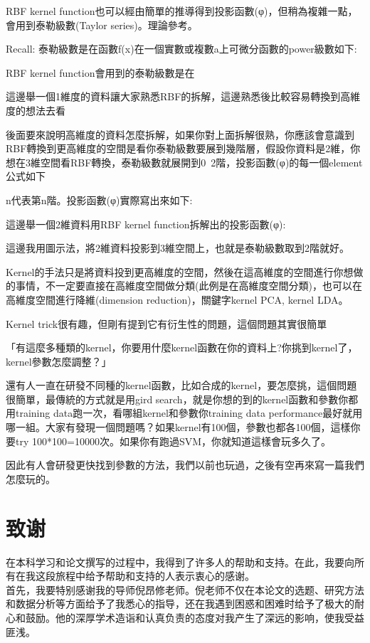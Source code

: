 \documentclass[12pt,a4paper]{amsart}
\begin{document}
RBF kernel function也可以經由簡單的推導得到投影函數(φ)，但稍為複雜一點，會用到泰勒級數(Taylor series)。理論參考。

Recall: 泰勒級數是在函數f(x)在一個實數或複數a上可微分函數的power級數如下:


RBF kernel function會用到的泰勒級數是在


這邊舉一個1維度的資料讓大家熟悉RBF的拆解，這邊熟悉後比較容易轉換到高維度的想法去看


後面要來說明高維度的資料怎麼拆解，如果你對上面拆解很熟，你應該會意識到RBF轉換到更高維度的空間是看你泰勒級數要展到幾階層，假設你資料是2維，你想在3維空間看RBF轉換，泰勒級數就展開到0~2階，投影函數(φ)的每一個element公式如下


n代表第n階。投影函數(φ)實際寫出來如下:


這邊舉一個2維資料用RBF kernel function拆解出的投影函數(φ):


這邊我用圖示法，將2維資料投影到3維空間上，也就是泰勒級數取到2階就好。



Kernel的手法只是將資料投到更高維度的空間，然後在這高維度的空間進行你想做的事情，不一定要直接在高維度空間做分類(此例是在高維度空間分類)，也可以在高維度空間進行降維(dimension reduction)，關鍵字kernel PCA, kernel LDA。

Kernel trick很有趣，但剛有提到它有衍生性的問題，這個問題其實很簡單

「有這麼多種類的kernel，你要用什麼kernel函數在你的資料上?你挑到kernel了，kernel參數怎麼調整？」

還有人一直在研發不同種的kernel函數，比如合成的kernel，要怎麼挑，這個問題很簡單，最傳統的方式就是用gird search，就是你想的到的kernel函數和參數你都用training data跑一次，看哪組kernel和參數你training data performance最好就用哪一組。大家有發現一個問題嗎？如果kernel有100個，參數也都各100個，這樣你要try 100*100=10000次。如果你有跑過SVM，你就知道這樣會玩多久了。

因此有人會研發更快找到參數的方法，我們以前也玩過，之後有空再來寫一篇我們怎麼玩的。

\section{致谢}

在本科学习和论文撰写的过程中，我得到了许多人的帮助和支持。在此，我要向所有在我这段旅程中给予帮助和支持的人表示衷心的感谢。\\

首先，我要特别感谢我的导师倪昂修老师。倪老师不仅在本论文的选题、研究方法和数据分析等方面给予了我悉心的指导，还在我遇到困惑和困难时给予了极大的耐心和鼓励。他的深厚学术造诣和认真负责的态度对我产生了深远的影响，使我受益匪浅。\\
\end{document}
